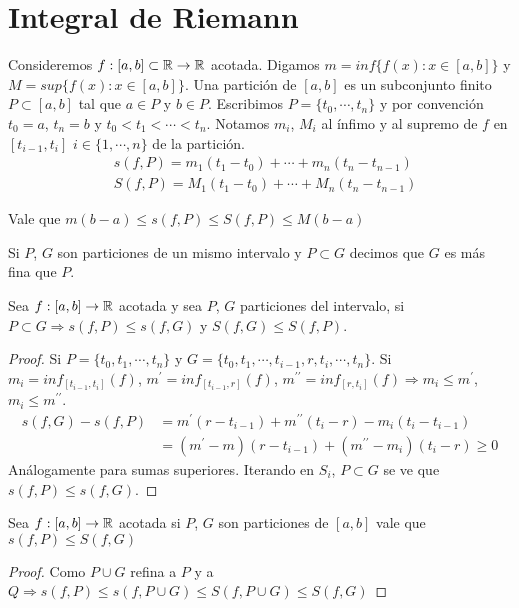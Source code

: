 \section{Integral de Riemann}

Consideremos $f: [a, b] \subset \mathbb{R} \to \mathbb{R}$ acotada. Digamos $m = inf\{ f(x) : x \in [a,b] \}$ y $M = sup \{ f(x) : x \in [a, b] \}$.
Una partición de $[a, b]$ es un subconjunto finito $P \subset [a, b]$ tal que $a \in P$ y $b \in P$.
Escribimos $P = \{ t_0, \cdots, t_n \}$ y por convención $t_0 = a$, $t_n = b$ y $t_0 < t_1 < \cdots < t_n$.
Notamos $m_i$, $M_i$ al ínfimo y al supremo de $f$ en $[t_{i-1}, t_i]$ $i \in \{ 1, \cdots, n \}$ de la partición.
\begin{align*}
   & s(f, P) = m_1 (t_1 - t_0) + \cdots + m_n (t_n - t_{n-1}) \\
   & S(f, P) = M_1 (t_1 - t_0) + \cdots + M_n (t_n - t_{n-1})
\end{align*}

Vale que $m (b-a) \leq s(f, P) \leq S(f, P) \leq M (b-a)$

\begin{definition}
  Si $P$, $G$ son particiones de un mismo intervalo y $P \subset G$ decimos que $G$ es más fina que $P$.
\end{definition}

\begin{lemma}
  Sea $f: [a, b] \to \mathbb{R}$ acotada y sea $P$, $G$ particiones del intervalo, si $P \subset G \Rightarrow s(f, P) \leq s(f, G)$ y $S(f, G) \leq S(f, P)$.
  \begin{proof}
    Si $P = \{ t_0, t_1, \cdots, t_n \}$ y $G = \{ t_0, t_1, \cdots, t_{i-1}, r, t_i, \cdots, t_n \}$. Si $m_i = inf_{[t_{i-1}, t_i]}(f)$, $m^{\prime} = inf_{[t_{i-1}, r]}(f)$, $m^{\prime \prime} = inf_{[r, t_i]}(f) \Rightarrow m_i \leq m^{\prime}$, $m_i \leq m^{\prime \prime}$. \begin{align*}
      s(f, G) - s(f, P) & = m^{\prime} (r - t_{i-1}) + m^{\prime \prime} (t_i - r) - m_i (t_i - t_{i-1}) \\
                        & = (m^{\prime} - m)(r - t_{i-1}) + (m^{\prime \prime} - m_i) (t_i - r) \geq 0
    \end{align*}
    Análogamente para sumas superiores. Iterando en $S_i$, $P \subset G$ se ve que $s(f, P) \leq s(f, G)$.
  \end{proof}
\end{lemma}

\begin{corollary}
  Sea $f: [a, b] \to \mathbb{R}$ acotada si $P$, $G$ son particiones de $[a, b]$ vale que $s(f, P) \leq S(f, G)$
  \begin{proof}
    Como $P \cup G$ refina a $P$ y a $Q \Rightarrow s(f, P) \leq s(f, P \cup G) \leq S(f, P \cup G) \leq S(f, G)$
  \end{proof}
\end{corollary}


